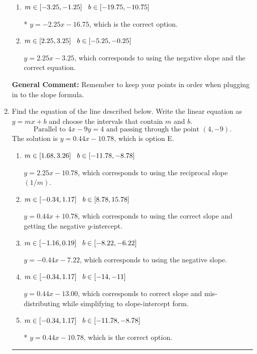 \documentclass{extbook}[14pt]
\newcommand{\litem}[1]{\item #1

\rule{\textwidth}{0.4pt}}
\begin{document}
\begin{enumerate}
{\begin{enumerate}[label=\Alph*.]
 $y = -2.25x + 16.75$, which corresponds to using the correct slope and getting the negative y-intercept.
\item \( m \in [-3.25, -1.25] \hspace*{3mm} b \in [-19.75, -10.75] \)

* $y = -2.25x -16.75$, which is the correct option.
\item \( m \in [2.25, 3.25] \hspace*{3mm} b \in [-5.25, -0.25] \)

 $y = 2.25x -3.25$, which corresponds to using the negative slope and the correct equation.
\end{enumerate}

\textbf{General Comment:} Remember to keep your points in order when plugging in to the slope formula.
}
\litem{
Find the equation of the line described below. Write the linear equation as $ y=mx+b $ and choose the intervals that contain $m$ and $b$.
\[ \text{Parallel to } 4 x - 9 y = 4 \text{ and passing through the point } (4, -9). \]The solution is \( y = 0.44x - 10.78 \), which is option E.\begin{enumerate}[label=\Alph*.]
\item \( m \in [1.68, 3.26] \hspace*{3mm} b \in [-11.78, -8.78] \)

 $y = 2.25x - 10.78$, which corresponds to using the reciprocal slope $(1/m)$.
\item \( m \in [-0.34, 1.17] \hspace*{3mm} b \in [8.78, 15.78] \)

 $y = 0.44x + 10.78$, which corresponds to using the correct slope and getting the negative $y$-intercept.
\item \( m \in [-1.16, 0.19] \hspace*{3mm} b \in [-8.22, -6.22] \)

 $y = -0.44x - 7.22$, which corresponds to using the negative slope.
\item \( m \in [-0.34, 1.17] \hspace*{3mm} b \in [-14, -11] \)

 $y = 0.44x - 13.00$, which corresponds to correct slope and mis-distributing while simplifying to slope-intercept form.
\item \( m \in [-0.34, 1.17] \hspace*{3mm} b \in [-11.78, -8.78] \)

* $y = 0.44x - 10.78$, which is the correct option.
\end{enumerate}

}
\end{enumerate}
\end{document}
